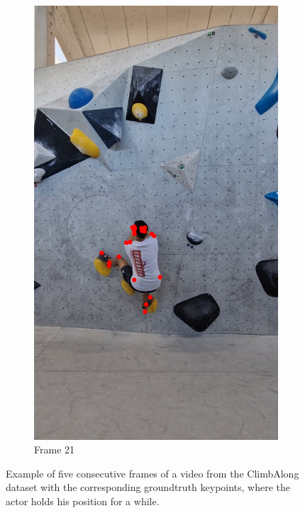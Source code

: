 \documentclass[./main.tex]{subfiles}
\begin{document}
\begin{figure}[htbp]
\begin{subfigure}{0.3\textwidth}
        \includegraphics[width=\textwidth]{entities/CA_21.png}
        \caption{Frame 21}
    \end{subfigure}
    \caption{Example of five consecutive frames of a video from the ClimbAlong dataset with the corresponding groundtruth keypoints, where the actor holds his position for a while.}
    \label{fig:CA_dataset_static}
\end{figure}
\end{document}
